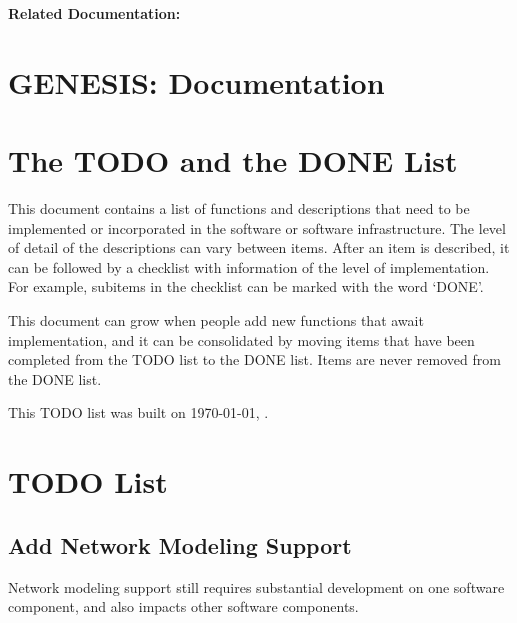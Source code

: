 \documentclass[12pt]{article}
\begin{document}
{\bf Related Documentation:}

\section*{GENESIS: Documentation}

\section{The TODO and the DONE List}

This document contains a list of functions and descriptions that need
to be implemented or incorporated in the software or software
infrastructure.  The level of detail of the descriptions can vary
between items.  After an item is described, it can be followed by a
checklist with information of the level of implementation.  For
example, subitems in the checklist can be marked with the word `DONE'.

This document can grow when people add new functions that await
implementation, and it can be consolidated by moving items that have
been completed from the TODO list to the DONE list.  Items are never
removed from the DONE list.

This TODO list was built on \today, \thistime.


\section{TODO List}

\subsection{Add Network Modeling Support}

Network modeling support still requires substantial development on one
software component, and also impacts other software components.
\end{document}
